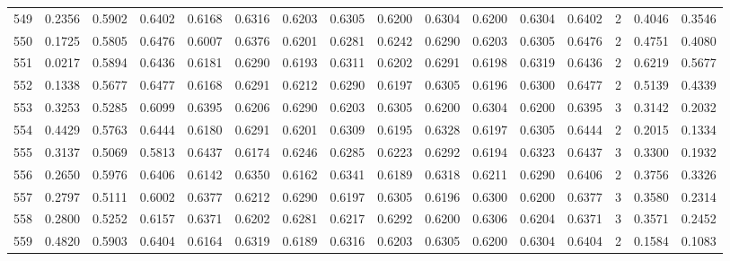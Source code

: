 \begin{tabular}{lrrrrrrrrrrrrrrr}
549 &      0.2356 &  0.5902 &  0.6402 &  0.6168 &  0.6316 &  0.6203 &  0.6305 &  0.6200 &  0.6304 &  0.6200 &   0.6304 &     0.6402 &      2 &                    0.4046 &                     0.3546 \\
550 &      0.1725 &  0.5805 &  0.6476 &  0.6007 &  0.6376 &  0.6201 &  0.6281 &  0.6242 &  0.6290 &  0.6203 &   0.6305 &     0.6476 &      2 &                    0.4751 &                     0.4080 \\
551 &      0.0217 &  0.5894 &  0.6436 &  0.6181 &  0.6290 &  0.6193 &  0.6311 &  0.6202 &  0.6291 &  0.6198 &   0.6319 &     0.6436 &      2 &                    0.6219 &                     0.5677 \\
552 &      0.1338 &  0.5677 &  0.6477 &  0.6168 &  0.6291 &  0.6212 &  0.6290 &  0.6197 &  0.6305 &  0.6196 &   0.6300 &     0.6477 &      2 &                    0.5139 &                     0.4339 \\
553 &      0.3253 &  0.5285 &  0.6099 &  0.6395 &  0.6206 &  0.6290 &  0.6203 &  0.6305 &  0.6200 &  0.6304 &   0.6200 &     0.6395 &      3 &                    0.3142 &                     0.2032 \\
554 &      0.4429 &  0.5763 &  0.6444 &  0.6180 &  0.6291 &  0.6201 &  0.6309 &  0.6195 &  0.6328 &  0.6197 &   0.6305 &     0.6444 &      2 &                    0.2015 &                     0.1334 \\
555 &      0.3137 &  0.5069 &  0.5813 &  0.6437 &  0.6174 &  0.6246 &  0.6285 &  0.6223 &  0.6292 &  0.6194 &   0.6323 &     0.6437 &      3 &                    0.3300 &                     0.1932 \\
556 &      0.2650 &  0.5976 &  0.6406 &  0.6142 &  0.6350 &  0.6162 &  0.6341 &  0.6189 &  0.6318 &  0.6211 &   0.6290 &     0.6406 &      2 &                    0.3756 &                     0.3326 \\
557 &      0.2797 &  0.5111 &  0.6002 &  0.6377 &  0.6212 &  0.6290 &  0.6197 &  0.6305 &  0.6196 &  0.6300 &   0.6200 &     0.6377 &      3 &                    0.3580 &                     0.2314 \\
558 &      0.2800 &  0.5252 &  0.6157 &  0.6371 &  0.6202 &  0.6281 &  0.6217 &  0.6292 &  0.6200 &  0.6306 &   0.6204 &     0.6371 &      3 &                    0.3571 &                     0.2452 \\
559 &      0.4820 &  0.5903 &  0.6404 &  0.6164 &  0.6319 &  0.6189 &  0.6316 &  0.6203 &  0.6305 &  0.6200 &   0.6304 &     0.6404 &      2 &                    0.1584 &                     0.1083 \\

\end{tabular}

